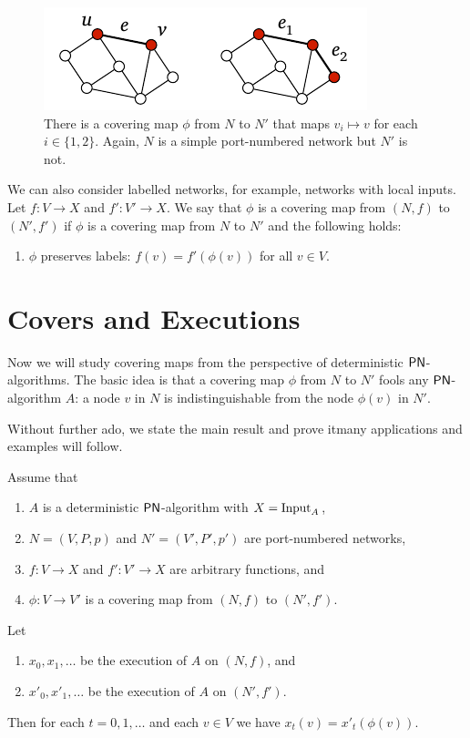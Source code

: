 \begin{figure}
    \centering
    \includegraphics[page=\PCoveringMapC]{figs.pdf}
    \caption{There is a covering map $\phi$ from $N$ to $N'$ that maps $v_i \mapsto v$ for each $i \in \{1, 2\}$. Again, $N$ is a simple port-numbered network but $N'$ is not.}\label{fig:covering-map3}
\end{figure}

We can also consider labelled networks, for example, networks with local inputs. Let $f\colon V \to X$ and $f'\colon V' \to X$. We say that $\phi$ is a covering map from $(N,f)$ to $(N'\!,f')$ if $\phi$ is a covering map from $N$ to $N'$ and the following holds:
\begin{enumerate}[resume*]
    \item $\phi$ preserves labels: $f(v) = f'(\phi(v))$ for all $v \in V$.
\end{enumerate}

\section{Covers and Executions}

Now we will study covering maps from the perspective of deterministic $\textup{\sffamily PN}$-algorithms. The basic idea is that a covering map $\phi$ from $N$ to $N'$ fools any $\textup{\sffamily PN}$-algorithm $A$: a node $v$ in $N$ is indistinguishable from the node $\phi(v)$ in $N'$.

Without further ado, we state the main result and prove it\mydash many applications and examples will follow.

\begin{theorem}\label{thm:cover}
    Assume that
    \begin{enumerate}[itemsep=0ex]\raggedright
        \item $A$ is a deterministic $\textup{\sffamily PN}$-algorithm with $X = \operatorname{Input}_A$,
        \item $N = (V,P,p)$ and $N' = (V'\!,P'\!,p')$ are port-numbered networks,
        \item $f\colon V \to X$ and $f'\colon V' \to X$ are arbitrary functions, and
        \item $\phi\colon V \to V'$ is a covering map from $(N,f)$ to $(N'\!,f')$.
    \end{enumerate}
    Let
    \begin{enumerate}[resume*]
        \item $x_0, x_1, \dotsc$ be the execution of $A$ on $(N,f)$, and
        \item $x'_0, x'_1, \dotsc$ be the execution of $A$ on $(N'\!,f')$.
    \end{enumerate}
    Then for each $t = 0, 1, \dotsc$ and each $v \in V$ we have $x_t(v) = x'_t(\phi(v))$.
\end{theorem}

